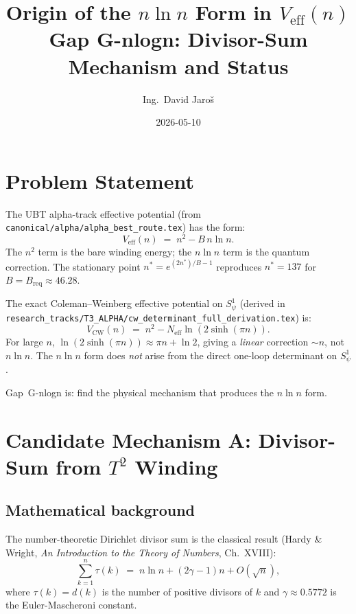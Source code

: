 \documentclass[12pt,a4paper]{article}
\title{\textbf{Origin of the $n\ln n$ Form in $V_{\mathrm{eff}}(n)$}\\[4pt]
         \large Gap G-nlogn: Divisor-Sum Mechanism and Status}
\author{Ing.\ David Jaro\v{s}}
\date{2026-05-10}
\theoremstyle{remark}
\newcommand{\Veff}{V_{\mathrm{eff}}}
\newcommand{\Neff}{N_{\mathrm{eff}}}
\begin{document}
  \maketitle
\fi

\section{Problem Statement}
\label{sec:problem}

The UBT alpha-track effective potential (from \texttt{canonical/alpha/alpha\_best\_route.tex})
has the form:
\begin{equation}
  \Veff(n) \;=\; n^2 - B\,n\ln n.
  \label{eq:Veff}
\end{equation}
The $n^2$ term is the bare winding energy; the $n\ln n$ term is the
quantum correction.  The stationary point $n^* = e^{(2n^*)/B - 1}$
reproduces $n^* = 137$ for $B = B_{\mathrm{req}} \approx 46.28$.

The exact Coleman--Weinberg effective potential on $S^1_\psi$ (derived in
\texttt{research\_tracks/T3\_ALPHA/cw\_determinant\_full\_derivation.tex}) is:
\begin{equation}
  V_{\mathrm{CW}}(n) \;=\; n^2 - \Neff\ln(2\sinh(\pi n)).
  \label{eq:VCW}
\end{equation}
For large $n$, $\ln(2\sinh(\pi n)) \approx \pi n + \ln 2$, giving a
\emph{linear} correction $\sim n$, not $n\ln n$.  The $n\ln n$ form does
\emph{not} arise from the direct one-loop determinant on $S^1_\psi$.

Gap~G-nlogn is: find the physical mechanism that produces the $n\ln n$ form.

\section{Candidate Mechanism A: Divisor-Sum from $T^2$ Winding}
\label{sec:divisor}

\subsection{Mathematical background}

The number-theoretic Dirichlet divisor sum is the classical result
(Hardy \& Wright, \emph{An Introduction to the Theory of Numbers}, Ch.~XVIII):
\begin{equation}
  \sum_{k=1}^{n} \tau(k) \;=\; n\ln n + (2\gamma - 1)n + O(\sqrt{n}),
  \label{eq:divisor_sum}
\end{equation}
where $\tau(k) = d(k)$ is the number of positive divisors of $k$ and
$\gamma \approx 0.5772$ is the Euler-Mascheroni constant.
\end{document}
